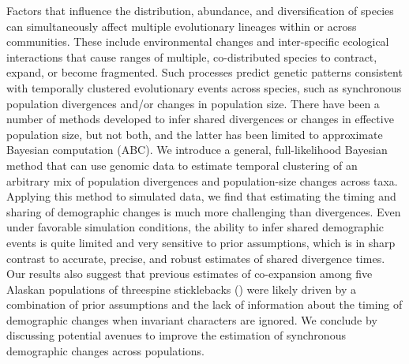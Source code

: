 Factors that influence the distribution, abundance, and
diversification of species can simultaneously affect multiple evolutionary
lineages within or across communities.
These include environmental changes and inter-specific ecological interactions
that cause ranges of multiple, co-distributed species to contract,
expand, or become fragmented.
Such processes predict genetic patterns consistent with temporally clustered
evolutionary events across species, such as synchronous population divergences
and/or changes in population size.
There have been a number of methods developed to infer shared divergences or
changes in effective population size, but not both, and the latter has been
limited to approximate Bayesian computation (ABC).
We introduce a general, full-likelihood Bayesian method that can use genomic
data to estimate temporal clustering of an arbitrary mix of population
divergences and population-size changes across taxa.
Applying this method to simulated data,
we find that estimating the timing and sharing of demographic changes is much
more challenging than divergences.
Even under favorable simulation conditions, the ability to infer shared
demographic events is quite limited and very sensitive to prior assumptions,
which is in sharp contrast to accurate, precise, and robust estimates of shared
divergence times.
Our results also suggest that previous estimates of co-expansion among five
Alaskan populations of threespine sticklebacks ()
were likely
driven by a combination of
prior assumptions and the lack of information about the timing of demographic
changes when invariant characters are ignored.
We conclude by discussing potential avenues to improve the estimation of
synchronous demographic changes across populations.
